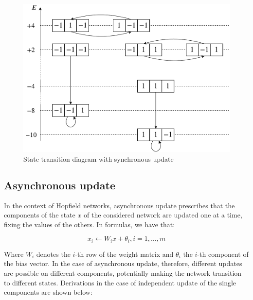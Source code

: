 \documentclass[letterpaper,headings=standardclasses]{scrartcl}
\begin{document}
\begin{figure}[h]
    \centering
    \includegraphics[width=0.7\linewidth]{sync.pdf}
    \caption{State transition diagram with synchronous update}
    \label{sync}
\end{figure}

\subsection{Asynchronous update}

In the context of Hopfield networks, asynchronous update prescribes that the components of the state $x$ of the considered network are updated one at a time, fixing the values of the others. In formulas, we have that:

$$ x_i \leftarrow W_i x + \theta_i, i = 1, \dots, m $$

Where $W_i$ denotes the $i$-th row of the weight matrix and $\theta_i$ the $i$-th component of the bias vector. In the case of asynchronous update, therefore, different updates are possible on different components, potentially making the network transition to different states. Derivations in the case of independent update of the single components are shown below:
\end{document}
